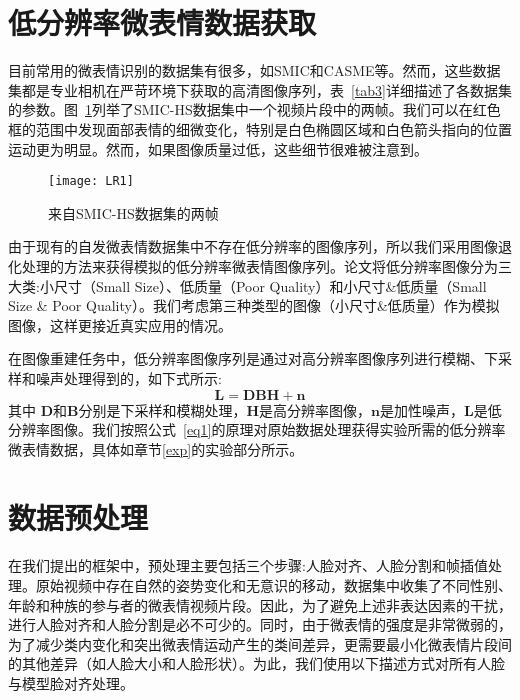 \section{低分辨率微表情数据获取}

目前常用的微表情识别的数据集有很多，如SMIC和CASME等。然而，这些数据集都是专业相机在严苛环境下获取的高清图像序列，表~\ref{tab3}详细描述了各数据集的参数。图~\ref{fig11}列举了SMIC-HS数据集中一个视频片段中的两帧。我们可以在红色框的范围中发现面部表情的细微变化，特别是白色椭圆区域和白色箭头指向的位置运动更为明显。然而，如果图像质量过低，这些细节很难被注意到。

\begin{figure}[!htbp]
\centering
\texttt{[image: LR1]}
\caption{来自SMIC-HS数据集的两帧}
\label{fig11}
\end{figure}

由于现有的自发微表情数据集中不存在低分辨率的图像序列，所以我们采用图像退化处理的方法来获得模拟的低分辨率微表情图像序列。论文将低分辨率图像分为三大类:小尺寸（Small Size）、低质量（Poor Quality）和小尺寸\&低质量（Small Size \& Poor Quality）。我们考虑第三种类型的图像（小尺寸\&低质量）作为模拟图像，这样更接近真实应用的情况。

在图像重建任务中，低分辨率图像序列是通过对高分辨率图像序列进行模糊、下采样和噪声处理得到的\citep{shi2018hallucinating}，如下式所示:
\begin{equation}
    \label{eq1}
    \boldsymbol{L} = \boldsymbol{DBH}+\boldsymbol{n}
\end{equation}
其中 $\boldsymbol{D}$和$\boldsymbol{B}$分别是下采样和模糊处理，$\boldsymbol{H}$是高分辨率图像，$\boldsymbol{n}$是加性噪声，$\boldsymbol{L}$是低分辨率图像。我们按照公式~\ref{eq1}的原理对原始数据处理获得实验所需的低分辨率微表情数据，具体如章节\ref{exp}的实验部分所示。

\section{数据预处理}

在我们提出的框架中，预处理主要包括三个步骤:人脸对齐、人脸分割和帧插值处理。原始视频中存在自然的姿势变化和无意识的移动，数据集中收集了不同性别、年龄和种族的参与者的微表情视频片段。因此，为了避免上述非表达因素的干扰，进行人脸对齐和人脸分割是必不可少的。同时，由于微表情的强度是非常微弱的，为了减少类内变化和突出微表情运动产生的类间差异，更需要最小化微表情片段间的其他差异（如人脸大小和人脸形状）。为此，我们使用以下描述方式对所有人脸与模型脸对齐处理。

